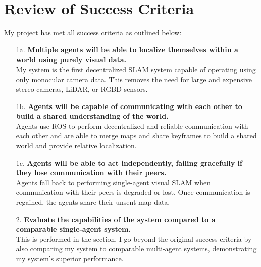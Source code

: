 

\label{sec:4}

\section{Review of Success Criteria}
\label{sec:review-of-success-criteria}
My project has met all success criteria as outlined below:

\begin{enumerate}[font=\bfseries]
    \item[1a.]\textbf{Multiple agents will be able to localize themselves within a world using purely visual data.} \\
    My system is the first decentralized SLAM system capable of operating using only monocular camera data. This removes the need for large and expensive stereo cameras, LiDAR, or RGBD sensors.

    \item[1b.]\textbf{Agents will be capable of communicating with each other to build a shared understanding of the world.} \\
    Agents use ROS to perform decentralized and reliable communication with each other and are able to merge maps and share keyframes to build a shared world and provide relative localization.

    \item[1c.]\textbf{Agents will be able to act independently, failing gracefully if they lose communication with their peers.} \\
    Agents fall back to performing single-agent visual SLAM when communication with their peers is degraded or lost. Once communication is regained, the agents share their unsent map data.

    \item[2.]\textbf{Evaluate the capabilities of the system compared to a comparable single-agent system.} \\
    This is performed in the  section. I go beyond the original success criteria by also comparing my system to comparable multi-agent systems, demonstrating my system's superior performance.

\end{enumerate}


